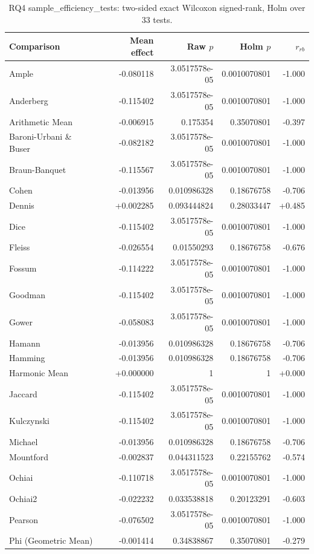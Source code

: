 \begin{longtable}{lrrrr}
\caption{RQ4 sample\_efficiency\_tests: two-sided exact Wilcoxon signed-rank, Holm over 33 tests.}\\
\toprule
Comparison & Mean effect & Raw $p$ & Holm $p$ & $r_{rb}$ \\
\midrule
Ample & -0.080118 & 3.0517578e-05 & 0.0010070801 & -1.000 \\
Anderberg & -0.115402 & 3.0517578e-05 & 0.0010070801 & -1.000 \\
Arithmetic Mean & -0.006915 & 0.175354 & 0.35070801 & -0.397 \\
Baroni-Urbani \& Buser & -0.082182 & 3.0517578e-05 & 0.0010070801 & -1.000 \\
Braun-Banquet & -0.115567 & 3.0517578e-05 & 0.0010070801 & -1.000 \\
Cohen & -0.013956 & 0.010986328 & 0.18676758 & -0.706 \\
Dennis & +0.002285 & 0.093444824 & 0.28033447 & +0.485 \\
Dice & -0.115402 & 3.0517578e-05 & 0.0010070801 & -1.000 \\
Fleiss & -0.026554 & 0.01550293 & 0.18676758 & -0.676 \\
Fossum & -0.114222 & 3.0517578e-05 & 0.0010070801 & -1.000 \\
Goodman & -0.115402 & 3.0517578e-05 & 0.0010070801 & -1.000 \\
Gower & -0.058083 & 3.0517578e-05 & 0.0010070801 & -1.000 \\
Hamann & -0.013956 & 0.010986328 & 0.18676758 & -0.706 \\
Hamming & -0.013956 & 0.010986328 & 0.18676758 & -0.706 \\
Harmonic Mean & +0.000000 & 1 & 1 & +0.000 \\
Jaccard & -0.115402 & 3.0517578e-05 & 0.0010070801 & -1.000 \\
Kulczynski & -0.115402 & 3.0517578e-05 & 0.0010070801 & -1.000 \\
Michael & -0.013956 & 0.010986328 & 0.18676758 & -0.706 \\
Mountford & -0.002837 & 0.044311523 & 0.22155762 & -0.574 \\
Ochiai & -0.110718 & 3.0517578e-05 & 0.0010070801 & -1.000 \\
Ochiai2 & -0.022232 & 0.033538818 & 0.20123291 & -0.603 \\
Pearson & -0.076502 & 3.0517578e-05 & 0.0010070801 & -1.000 \\
Phi (Geometric Mean) & -0.001414 & 0.34838867 & 0.35070801 & -0.279 \\

\end{longtable}
